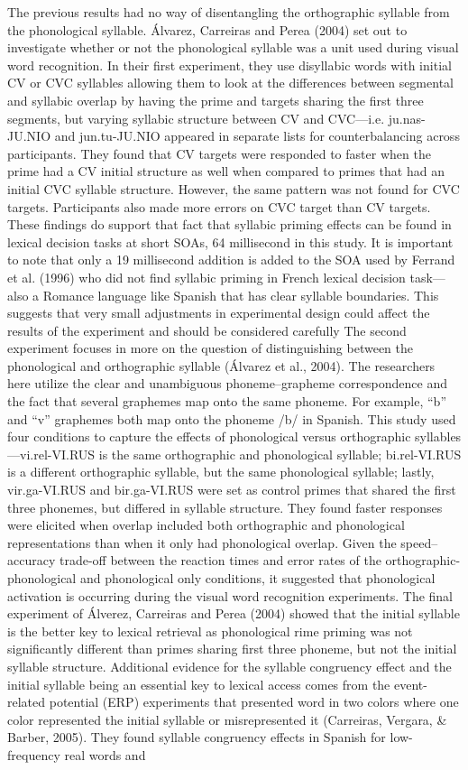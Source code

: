 The previous results had no way of disentangling the orthographic syllable from the phonological syllable. Álvarez, Carreiras and Perea (2004) set out to investigate whether or not the phonological syllable was a unit used during visual word recognition. In their first experiment, they use disyllabic words with initial CV or CVC syllables allowing them to look at the differences between segmental and syllabic overlap by having the prime and targets sharing the first three segments, but varying syllabic structure between CV and CVC—i.e. ju.nas-JU.NIO and jun.tu-JU.NIO appeared in separate lists for counterbalancing across participants. They found that CV targets were responded to faster when the prime had a CV initial structure as well when compared to primes that had an initial CVC syllable structure. However, the same pattern was not found for CVC targets. Participants also made more errors on CVC target than CV targets. These findings do support that fact that syllabic priming effects can be found in lexical decision tasks at short SOAs, 64 millisecond in this study. It is important to note that only a 19 millisecond addition is added to the SOA used by Ferrand et al. (1996) who did not find syllabic priming in French lexical decision task—also a Romance language like Spanish that has clear syllable boundaries. This suggests that very small adjustments in experimental design could affect the results of the experiment and should be considered carefully The second experiment focuses in more on the question of distinguishing between the phonological and orthographic syllable (Álvarez et al., 2004). The researchers here utilize the clear and unambiguous phoneme–grapheme correspondence and the fact that several graphemes map onto the same phoneme. For example, “b” and “v” graphemes both map onto the phoneme /b/ in Spanish. This study used four conditions to capture the effects of phonological versus orthographic syllables—vi.rel-VI.RUS is the same orthographic and phonological syllable; bi.rel-VI.RUS is a different orthographic syllable, but the same phonological syllable; lastly, vir.ga-VI.RUS and bir.ga-VI.RUS were set as control primes that shared the first three phonemes, but differed in syllable structure. They found faster responses were elicited when overlap included both orthographic and phonological representations than when it only had phonological overlap. Given the speed–accuracy trade-off between the reaction times and error rates of the orthographic-phonological and phonological only conditions, it suggested that phonological activation is occurring during the visual word recognition experiments. The final experiment of Álverez, Carreiras and Perea (2004) showed that the initial syllable is the better key to lexical retrieval as phonological rime priming was not significantly different than primes sharing first three phoneme, but not the initial syllable structure. Additional evidence for the syllable congruency effect and the initial syllable being an essential key to lexical access comes from the event-related potential (ERP) experiments that presented word in two colors where one color represented the initial syllable or misrepresented it (Carreiras, Vergara, \& Barber, 2005). They found syllable congruency effects in Spanish for low-frequency real words and 